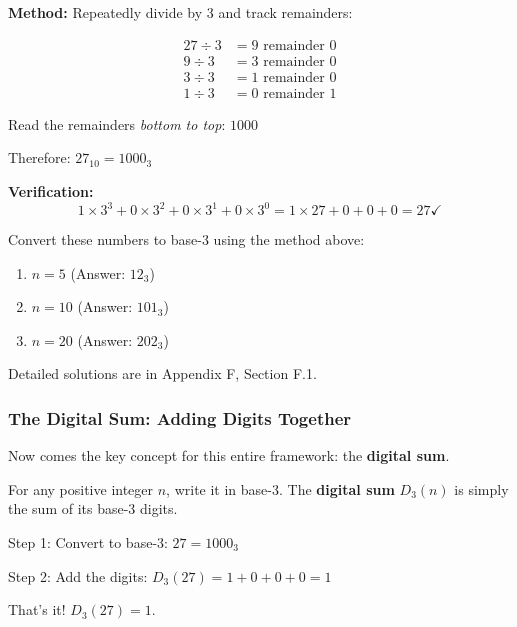 \begin{example}
\textbf{Method:} Repeatedly divide by 3 and track remainders:

\begin{align}
27 \div 3 &= 9 \text{ remainder } \boxed{0} \\
9 \div 3 &= 3 \text{ remainder } \boxed{0} \\
3 \div 3 &= 1 \text{ remainder } \boxed{0} \\
1 \div 3 &= 0 \text{ remainder } \boxed{1}
\end{align}

Read the remainders \textit{bottom to top}: $\boxed{1}\boxed{0}\boxed{0}\boxed{0}$

Therefore: $27_{10} = 1000_3$ \checkmark

\textbf{Verification:}
\begin{equation}
1\times 3^3 + 0\times 3^2 + 0\times 3^1 + 0\times 3^0 = 1\times 27 + 0 + 0 + 0 = 27 \checkmark
\end{equation}
\end{example}

\begin{tryit}
Convert these numbers to base-3 using the method above:
\begin{enumerate}
\item $n = 5$ (Answer: $12_3$)
\item $n = 10$ (Answer: $101_3$)
\item $n = 20$ (Answer: $202_3$)
\end{enumerate}

Detailed solutions are in Appendix F, Section F.1.
\end{tryit}

\subsubsection*{The Digital Sum: Adding Digits Together}

Now comes the key concept for this entire framework: the \textbf{digital sum}.

\begin{definition}
For any positive integer $n$, write it in base-3. The \textbf{digital sum} $D_3(n)$ is simply the sum of its base-3 digits.
\end{definition}

\begin{example}[Computing $D_3(27)$]
Step 1: Convert to base-3: $27 = 1000_3$

Step 2: Add the digits: $D_3(27) = 1 + 0 + 0 + 0 = 1$

That's it! $D_3(27) = 1$.
\end{example}

